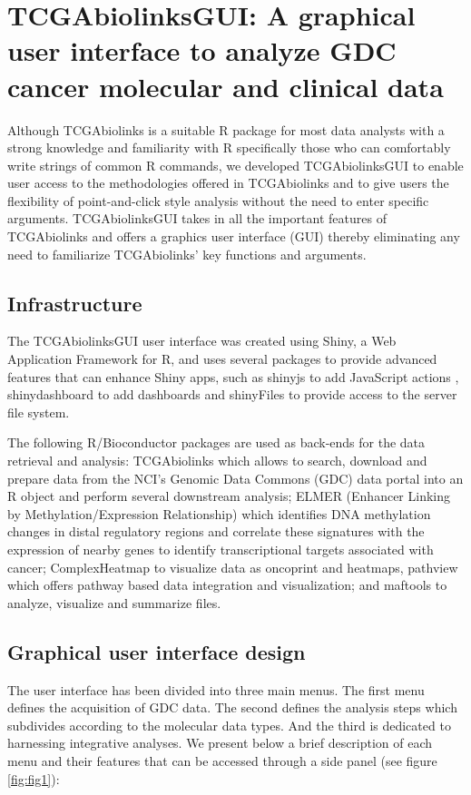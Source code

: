 \section{TCGAbiolinksGUI: A graphical user interface to analyze GDC cancer molecular and clinical data}

Although TCGAbiolinks is a suitable R package for most data analysts with a strong knowledge and familiarity with R specifically those who can comfortably write strings of common R commands, we developed TCGAbiolinksGUI to enable user access to the methodologies offered in TCGAbiolinks and to give users the flexibility of point-and-click style analysis without the need to enter specific arguments. TCGAbiolinksGUI takes in all the important features of TCGAbiolinks and offers a graphics user interface (GUI) thereby eliminating any need to familiarize TCGAbiolinks' key functions and arguments. 

\subsection{Infrastructure}
The TCGAbiolinksGUI user interface was created using Shiny, a Web Application Framework for R, and uses several packages to provide advanced features that can enhance Shiny apps, such as shinyjs to add JavaScript actions \cite{shinyjs}, shinydashboard to add dashboards \cite{shinydashboard} and shinyFiles \cite{shinyFiles} to provide access to the server file system. 

The following R/Bioconductor packages are used as back-ends for the data retrieval and analysis: TCGAbiolinks \cite{TCGAbiolinks} which allows to search, download and prepare data from the NCI's Genomic Data Commons (GDC) data portal into an R object and perform several downstream analysis;  ELMER (Enhancer Linking by Methylation/Expression Relationship) \cite{yao2015inferring, ELMER2} which identifies DNA methylation changes in distal regulatory regions and correlate these signatures with the expression of nearby genes to identify transcriptional targets associated with cancer; ComplexHeatmap \cite{Gu20052016} to visualize data as oncoprint and heatmaps, pathview \cite{luo2013pathview} which offers pathway based data integration and visualization; and maftools \cite{Maftools} to analyze, visualize and summarize  files.


\subsection{Graphical user interface design}
The user interface has been divided into three main  menus. The first menu defines the acquisition of GDC data. The second defines the analysis steps which subdivides according to the molecular data types.  And the third is dedicated to harnessing integrative analyses. We present below a brief description of each menu and their features that can be accessed through a side panel (see figure \ref{fig:fig1}): 


